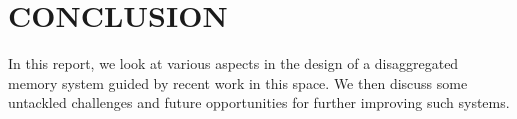 
\section{CONCLUSION}
\label{sec:conclusion}
In this report, we look at various aspects in  
the design of a disaggregated memory system
guided by recent work in this space. We then 
discuss some untackled challenges and future 
opportunities for further improving such systems. 
